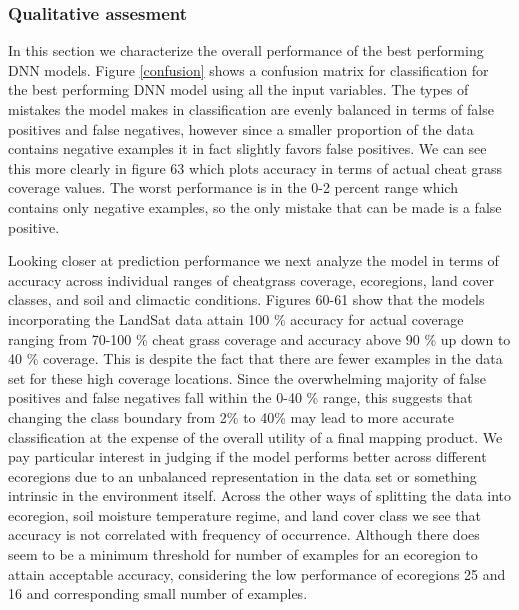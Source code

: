 \documentclass{article} %
\begin{document}
\subsubsection{Qualitative assesment}
In this section we characterize the overall performance of the best performing DNN models. Figure \ref{confusion} shows a confusion matrix for classification for the best performing DNN model using all the input variables. The types of mistakes the model makes in classification are evenly balanced in terms of false positives and false negatives, however since a smaller proportion of the data contains negative examples it in fact slightly favors false positives. We can see this more clearly in figure 63 which plots accuracy in terms of actual cheat grass coverage values. The worst performance is in the 0-2 percent range which contains only negative examples, so the only mistake that can be made is a false positive. 

Looking closer at prediction performance
we next analyze the model  in terms of accuracy across individual ranges of cheatgrass coverage, ecoregions, land cover classes, and soil and climactic conditions. 
Figures 60-61 show that the models incorporating the LandSat data attain 100 \% accuracy for actual coverage ranging from 70-100 \% cheat grass coverage and accuracy above 90 \% up down to 40 \% coverage. This is despite the fact that there are fewer examples in the data set for these high coverage locations. Since the overwhelming majority of false positives and false negatives fall within the 0-40 \% range, this suggests that changing the class boundary from 2\% to 40\% may lead to more accurate classification at the expense of the overall utility of a final mapping product.
We pay particular interest in judging if the model performs better across different ecoregions due to an unbalanced representation in the data set or something intrinsic in the environment itself.  
Across the other ways of splitting the data into ecoregion, soil moisture temperature regime, and land cover class we see that accuracy is not correlated with frequency of occurrence. Although there does seem to be a minimum threshold for number of examples for an ecoregion to attain acceptable accuracy, considering the low performance of ecoregions 25 and 16 and corresponding small number of examples.  
\end{document}
